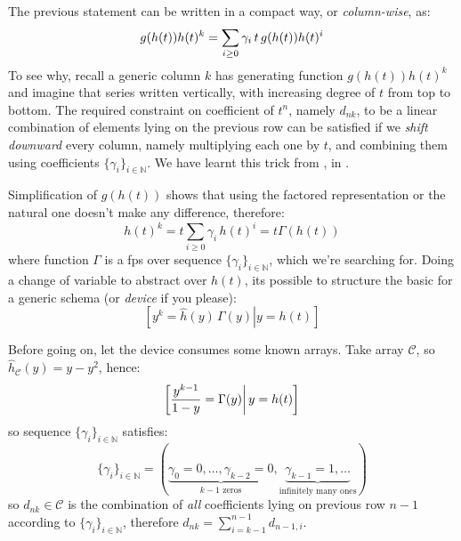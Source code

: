 The previous statement can be written in a compact way, or \emph{column-wise}, as:
\begin{displaymath}
    g(h(t))h(t)^k = \sum_{i\geq0}{\gamma_i\,t\,g(h(t)) h(t)^i}\\
\end{displaymath}
To see why, recall a generic column 
$k$ has generating function $g(h(t))h(t)^k$ and imagine that series written vertically, 
with increasing degree of $t$ from top to bottom.
The required constraint on coefficient of $t^n$, namely $d_{nk}$, 
to be a linear combination of elements lying on the previous row 
can be satisfied if we \emph{shift downward} every column,
namely multiplying each one by $t$, and combining them using coefficients
$\lbrace \gamma_{i} \rbrace_{i\in\mathbb{N}}$. 
We have learnt this trick from \citeauthor{shapiro:1991}, in \cite{shapiro:1991}.

Simplification of $g(h(t))$ shows that using the factored representation or
the natural one doesn't make any difference, therefore:
\begin{displaymath}
    h(t)^k = t \sum_{i\geq 0}{\gamma_i\,h(t)^i} = t \Gamma(h(t))
\end{displaymath}
where function $\Gamma$ is a \ac{fps} over sequence 
$\lbrace \gamma_{i} \rbrace_{i\in\mathbb{N}}$, which we're searching for.
Doing a change of variable to abstract over $h(t)$, its possible to
structure the basic for a generic schema (or \emph{device} if you please):
\begin{displaymath}
    \left.\left[y^{k} = \hat{h}(y)\,\Gamma(y) \right| y = h(t) \right]
\end{displaymath}

Before going on, let the device consumes some known arrays. Take 
array $\mathcal{C}$, so $\hat{h}_{\mathcal{C}}(y) = y-y^2$, hence:
\begin{displaymath}
    \left.\left[\frac{y^{k-1}}{1-y} =  \Gamma(y) \right| y = h(t) \right]\\
\end{displaymath}
so sequence $\lbrace \gamma_{i} \rbrace_{i\in\mathbb{N}}$ satisfies:
\begin{displaymath}
    \lbrace \gamma_{i} \rbrace_{i\in\mathbb{N}} = 
        \left(\underbrace{\gamma_{0}=0,\ldots,\gamma_{k-2}=0}_{k-1 \text{ zeros}},
            \underbrace{\gamma_{k-1}=1, \ldots}_{\text{infinitely many ones}} \right)
\end{displaymath}
so $d_{nk}\in\mathcal{C}$ is the combination of \emph{all} coefficients
lying on previous row $n-1$ according to $\lbrace \gamma_{i} \rbrace_{i\in\mathbb{N}}$,
therefore $d_{nk}=\sum_{i=k-1}^{n-1}{d_{n-1,i}}$.

